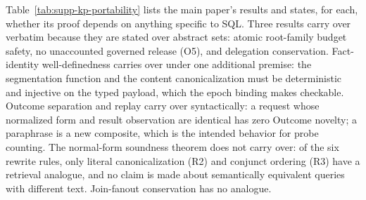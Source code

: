 \documentclass[journal,onecolumn]{IEEEtran}
\begin{document}
Table~\ref{tab:supp-kp-portability} lists the main paper's results and
states, for each, whether its proof depends on anything specific to SQL.
Three results carry over verbatim because they are stated over abstract
sets: atomic root-family budget safety, no unaccounted governed release
(O5), and delegation conservation. Fact-identity well-definedness carries
over under one additional premise: the segmentation function and the
content canonicalization must be deterministic and injective on the typed
payload, which the epoch binding makes checkable. Outcome separation and
replay carry over syntactically: a request whose normalized form and result
observation are identical has zero Outcome novelty; a paraphrase is a new
composite, which is the intended behavior for probe counting. The
normal-form soundness theorem does not carry over: of the six rewrite rules,
only literal canonicalization (R2) and conjunct ordering (R3) have a
retrieval analogue, and no claim is made about semantically equivalent
queries with different text. Join-fanout conservation has no analogue.
\end{document}
